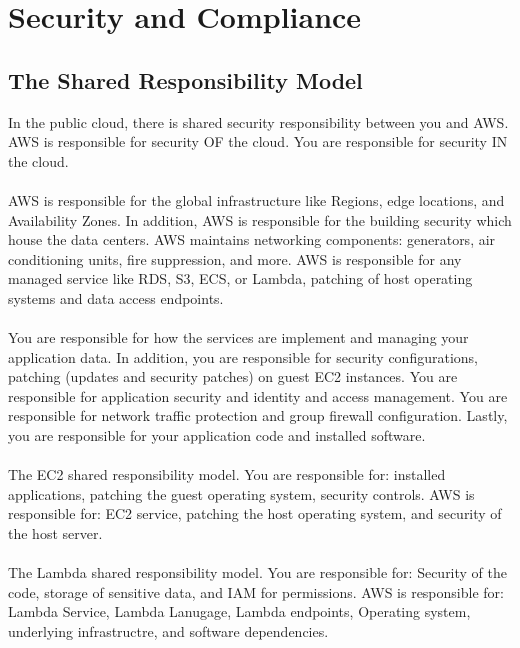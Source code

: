 \documentclass{article}%
\begin{document}
\section{Security and Compliance}
\subsection{The Shared Responsibility Model}
In the public cloud, there is shared security responsibility between you and AWS.
AWS is responsible for security OF the cloud.
You are responsible for security IN the cloud. \\ \\

AWS is responsible for the global infrastructure like Regions, edge locations, and Availability Zones. 
In addition, AWS is responsible for the building security which house the data centers. AWS maintains networking
components: generators, air conditioning units, fire suppression, and more. AWS is responsible for any managed service 
like RDS, S3, ECS, or Lambda, patching of host operating systems and data access endpoints. \\ \\

You are responsible for how the services are implement and managing your application data. In addition, you are responsible for security configurations, patching (updates and security patches) on guest EC2 instances. You are responsible
for application security and identity and access management. You are responsible for network traffic protection and group firewall configuration. Lastly, you are responsible for your application code and installed software. \\ \\

The EC2 shared responsibility model. You are responsible for: installed applications, patching the guest operating system, security controls. AWS is responsible for: EC2 service, patching the host operating system, and security of the host server. \\ \\

The Lambda shared responsibility model. You are responsible for: Security of the code, storage of sensitive data, and IAM for permissions. AWS is responsible for: Lambda Service, Lambda Lanugage, Lambda endpoints, Operating system, underlying infrastructre, and software dependencies. \\ \\
\end{document}
